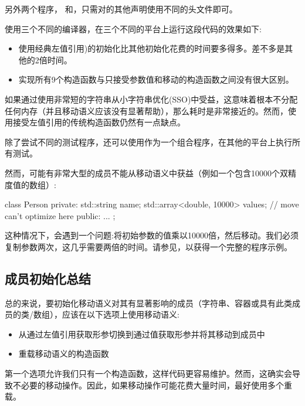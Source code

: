 另外两个程序， 和，只需对的其他声明使用不同的头文件即可。

使用三个不同的编译器，在三个不同的平台上运行这段代码的效果如下:

\begin{itemize}
	\item 使用经典左值引用)的初始化比其他初始化花费的时间要多得多。差不多是其他的2倍时间。
	\item 实现所有9个构造函数与只接受参数值和移动的构造函数之间没有很大区别。
\end{itemize}

如果通过使用非常短的字符串从小字符串优化(SSO)中受益，这意味着根本不分配任何内存（并且移动语义应该没有显著帮助），那么耗时是非常接近的。然而，使用接受左值引用的传统构造函数仍然有一点缺点。

除了尝试不同的测试程序，还可以使用作为一个组合程序，在其他的平台上执行所有测试。

然而，可能有非常大型的成员不能从移动语义中获益（例如一个包含10000个双精度值的数组）:

\begin{cppcode}
class Person {
private:
	std::string name;
	std::array<double, 10000> values; // move can’t optimize here
public:
	...
};
\end{cppcode}

这种情况下，会遇到一个问题:将初始参数的值乘以10000倍，然后移动。我们必须复制参数两次，这几乎需要两倍的时间。请参见，以获得一个完整的程序示例。

\subsection{成员初始化总结}

总的来说，要初始化移动语义对其有显著影响的成员（字符串、容器或具有此类成员的类/数组），应该在以下选项上使用移动语义:

\begin{itemize}
	\item 从通过左值引用获取形参切换到通过值获取形参并将其移动到成员中
	\item 重载移动语义的构造函数
\end{itemize}

第一个选项允许我们只有一个构造函数，这样代码更容易维护。然而，这确实会导致不必要的移动操作。因此，如果移动操作可能花费大量时间，最好使用多个重载。

